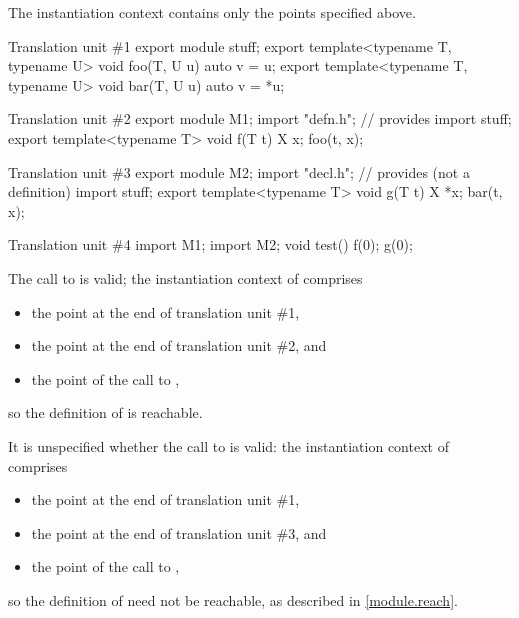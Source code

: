 \pnum
The instantiation context contains only the points specified above.

\pnum
\begin{example}
\begin{codeblocktu}{Translation unit \#1}
export module stuff;
export template<typename T, typename U> void foo(T, U u) { auto v = u; }
export template<typename T, typename U> void bar(T, U u) { auto v = *u; }
\end{codeblocktu}

\begin{codeblocktu}{Translation unit \#2}
export module M1;
import "defn.h";        // provides 
import stuff;
export template<typename T> void f(T t) {
  X x;
  foo(t, x);
}
\end{codeblocktu}

\begin{codeblocktu}{Translation unit \#3}
export module M2;
import "decl.h";        // provides  (not a definition)
import stuff;
export template<typename T> void g(T t) {
  X *x;
  bar(t, x);
}
\end{codeblocktu}

\begin{codeblocktu}{Translation unit \#4}
import M1;
import M2;
void test() {
  f(0);
  g(0);
}
\end{codeblocktu}
The call to  is valid;
the instantiation context of  comprises
\begin{itemize}
\item the point at the end of translation unit \#1,
\item the point at the end of translation unit \#2, and
\item the point of the call to ,
\end{itemize}
so the definition of  is reachable.

It is unspecified whether the call to  is valid:
the instantiation context of  comprises
\begin{itemize}
\item the point at the end of translation unit \#1,
\item the point at the end of translation unit \#3, and
\item the point of the call to ,
\end{itemize}
so the definition of  need not be reachable,
as described in \ref{module.reach}.
\end{example}

